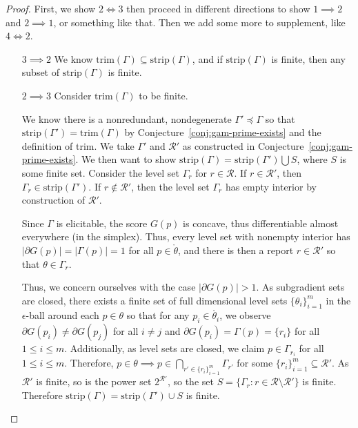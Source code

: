 \documentclass[12pt]{article}
\newcommand{\Comments}{1}
\newcommand{\mynote}[2]{\ifnum\Comments=1\textcolor{#1}{#2}\fi}
\newcommand{\jessie}[1]{\mynote{purple}{[JF: #1]}}
\newcommand{\R}{\mathcal{R}}
\newcommand{\inter}[1]{\mathring{#1}}%
\newcommand{\trim}{\mathrm{trim}}
\newcommand{\strip}{\mathrm{strip}}
\begin{document}
\begin{proof}
First, we show $2 \iff 3$ then proceed in different directions to show $1\implies 2$ and $2 \implies 1$, or something like that.
Then we add some more to supplement, like $4 \iff 2$.

\begin{enumerate}
	\item [$3 \implies 2$]
	We know $\trim(\Gamma) \subseteq \strip(\Gamma)$, and if $\strip(\Gamma)$ is finite, then any subset of $\strip(\Gamma)$ is finite.
	
	\item[$2 \implies 3$] 
	Consider $\trim(\Gamma)$ to be finite.
	
	We know there is a nonredundant, nondegenerate $\Gamma' \preceq \Gamma$ so that $\strip(\Gamma') = \trim(\Gamma)$ by Conjecture~\ref{conj:gam-prime-exists} and the definition of trim.
	We take $\Gamma'$ and $\R'$ as constructed in Conjecture~\ref{conj:gam-prime-exists}.
	We then want to show $\strip(\Gamma) = \strip(\Gamma') \bigcup S$, where $S$ is some finite set.
	Consider the level set $\Gamma_r$ for $r \in \R$.
	If $r \in \R'$, then $\Gamma_r \in \strip(\Gamma')$.
	If $r \not \in \R'$, then the level set $\Gamma_r$ has empty interior by construction of $\R'$.
	
	Since $\Gamma$ is elicitable, the score $G(p)$ is concave, thus differentiable almost everywhere (in the simplex).
	Thus, every level set with nonempty interior has $|\partial G(p)| = |\Gamma(p)| = 1$ for all $p \in \inter{\theta}$, and there is then a report $r \in \R'$ so that $\theta \in \Gamma_r$.
	
	Thus, we concern ourselves with the case $|\partial G(p)| > 1$.
	As subgradient sets are closed, there exists a finite set of full dimensional level sets $\{\theta_i\}_{i=1}^m$ in the $\epsilon$-ball around each $p \in \theta$ so that for any $p_i \in \inter{\theta_i}$, we observe $\partial G(p_i) \neq \partial G(p_j)$ for all $i \neq j$ and $\partial G(p_i) = \Gamma(p) = \{r_i\}$ for all $1 \leq i \leq m$.
	Additionally, as level sets are closed, we claim $p \in \Gamma_{r_i}$ for all $1 \leq i \leq m$.
	Therefore, $p \in \theta \implies p \in \bigcap_{r' \in \{r_i\}_{i=1}^m} \Gamma_{r'}$ for some $\{r_i\}_{i=1}^m \subseteq \R'$.
	As $\R'$ is finite, so is the power set $2^{\R'}$, so the set $S = \{\Gamma_r : r \in \R \setminus \R' \}$ is finite.
	Therefore $\strip(\Gamma) = \strip(\Gamma') \cup S$ is finite. 
	

\end{enumerate}
\end{proof}
\end{document}
